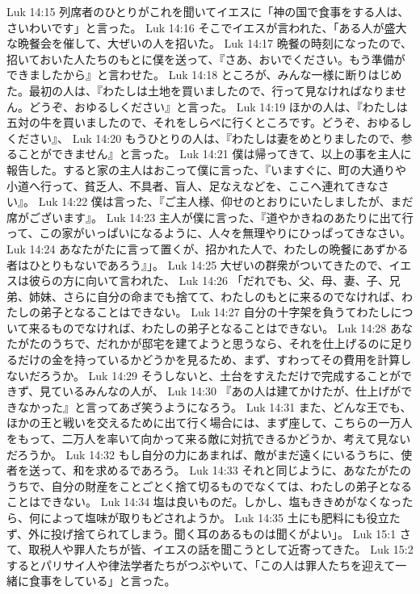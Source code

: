 Luk 14:15  列席者のひとりがこれを聞いてイエスに「神の国で食事をする人は、さいわいです」と言った。
Luk 14:16  そこでイエスが言われた、「ある人が盛大な晩餐会を催して、大ぜいの人を招いた。
Luk 14:17  晩餐の時刻になったので、招いておいた人たちのもとに僕を送って、『さあ、おいでください。もう準備ができましたから』と言わせた。
Luk 14:18  ところが、みんな一様に断りはじめた。最初の人は、『わたしは土地を買いましたので、行って見なければなりません。どうぞ、おゆるしください』と言った。
Luk 14:19  ほかの人は、『わたしは五対の牛を買いましたので、それをしらべに行くところです。どうぞ、おゆるしください』、
Luk 14:20  もうひとりの人は、『わたしは妻をめとりましたので、参ることができません』と言った。
Luk 14:21  僕は帰ってきて、以上の事を主人に報告した。すると家の主人はおこって僕に言った、『いますぐに、町の大通りや小道へ行って、貧乏人、不具者、盲人、足なえなどを、ここへ連れてきなさい』。
Luk 14:22  僕は言った、『ご主人様、仰せのとおりにいたしましたが、まだ席がございます』。
Luk 14:23  主人が僕に言った、『道やかきねのあたりに出て行って、この家がいっぱいになるように、人々を無理やりにひっぱってきなさい。
Luk 14:24  あなたがたに言って置くが、招かれた人で、わたしの晩餐にあずかる者はひとりもないであろう』」。
Luk 14:25  大ぜいの群衆がついてきたので、イエスは彼らの方に向いて言われた、
Luk 14:26  「だれでも、父、母、妻、子、兄弟、姉妹、さらに自分の命までも捨てて、わたしのもとに来るのでなければ、わたしの弟子となることはできない。
Luk 14:27  自分の十字架を負うてわたしについて来るものでなければ、わたしの弟子となることはできない。
Luk 14:28  あなたがたのうちで、だれかが邸宅を建てようと思うなら、それを仕上げるのに足りるだけの金を持っているかどうかを見るため、まず、すわってその費用を計算しないだろうか。
Luk 14:29  そうしないと、土台をすえただけで完成することができず、見ているみんなの人が、
Luk 14:30  『あの人は建てかけたが、仕上げができなかった』と言ってあざ笑うようになろう。
Luk 14:31  また、どんな王でも、ほかの王と戦いを交えるために出て行く場合には、まず座して、こちらの一万人をもって、二万人を率いて向かって来る敵に対抗できるかどうか、考えて見ないだろうか。
Luk 14:32  もし自分の力にあまれば、敵がまだ遠くにいるうちに、使者を送って、和を求めるであろう。
Luk 14:33  それと同じように、あなたがたのうちで、自分の財産をことごとく捨て切るものでなくては、わたしの弟子となることはできない。
Luk 14:34  塩は良いものだ。しかし、塩もききめがなくなったら、何によって塩味が取りもどされようか。
Luk 14:35  土にも肥料にも役立たず、外に投げ捨てられてしまう。聞く耳のあるものは聞くがよい」。
Luk 15:1  さて、取税人や罪人たちが皆、イエスの話を聞こうとして近寄ってきた。
Luk 15:2  するとパリサイ人や律法学者たちがつぶやいて、「この人は罪人たちを迎えて一緒に食事をしている」と言った。
